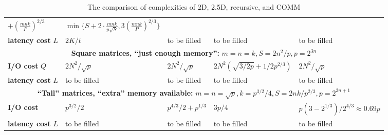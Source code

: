 \documentclass[sigplan,review,anonymous,10pt]{acmart}\settopmatter{printfolios=true,printccs=false,printacmref=false}
\begin{document}
\begin{table}
\begin{tabular}{lllll}
{			$ + \left(\frac{mnk}{P}\right)^{2/3}$}
		& 
		$\min \Big\{S + 2 \cdot \frac{mnk}{p\sqrt{S}}, 3 
		\left(\frac{mnk}{P}\right)^{2/3} \Big\}$
		\\
		\textbf{latency cost} $L$
		&
		$2K/t$
		&
		to be filled
		&
		to be filled
		& 
		to be filled 
		\\
		\midrule
		\multicolumn{5}{c}{\textbf{Square matrices, ``just enough memory'':} $m 
		= n = 
			k, S = 2{n^2}/{p}, p=2^{3n}$} \\
		\textbf{I/O cost} $Q$
		&
		${2N^2 }/{\sqrt{p}}$
		&
		${2N^2 }/{\sqrt{p}}$
		&
		$2N^2 \left(\sqrt{{3}/{2p}} + {1}/{2p^{2/3}} \right)$
		& 
		${2N^2 }/{\sqrt{p}}$
		\\
		\textbf{latency cost} $L$
		&
		to be filled
		&
		to be filled
		&
		to be filled
		& 
		to be filled
		\\
		\midrule
		\multicolumn{5}{c}{\textbf{``Tall'' matrices, ``extra'' memory 
		available:} $m = 
			n = \sqrt{p}, k = {p^{3/2}}/{4}, S = 2{nk}/{p^{2/3}}, p=2^{3n + 
			1}$} \\
		\textbf{I/O cost}
		&
		${p^{3/2}}/{2}$
		&
		${p^{4/3}}/{2} + p^{1/3}$
		&
		${3p}/{4}$
		& 
		$p\left({3-2^{1/3}}\right)/{2^{4/3}} \approx 0.69 p$
		\\
		\textbf{latency cost} $L$
		&
		to be filled
		&
		to be filled
		&
		to be filled
		& 
		to be filled
		\\
		\bottomrule
	\end{tabular}
	\caption{The comparison of complexities of 2D, 2.5D, recursive, and COMM 
}
\end{table}
\end{document}
